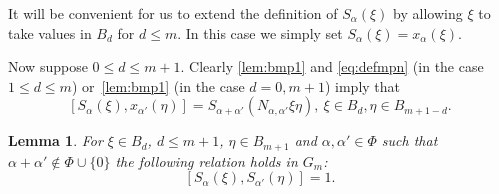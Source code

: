 \documentclass[oneside, 10pt]{amsart}
\numberwithin{equation}{section}
\newtheorem{lemma}{Lemma}
\numberwithin{lemma}{section}
\theoremstyle{definition}
\theoremstyle{remark}
\begin{document}
It will be convenient for us to extend the definition of $S_\alpha(\xi)$ by allowing $\xi$ to take values in $B_d$ for $d\leq m$.
In this case we simply set $S_\alpha(\xi) = x_\alpha(\xi)$.

Now suppose  $0 \leq d \leq m+1$. Clearly \eqref{lem:bmp1} and \eqref{eq:defmpn} (in the case $1\leq d\leq m$) or~\cref{lem:bmp1} (in the case $d=0,m+1$) imply that
\begin{equation} \label{eq:verify-bmp1'} 
[S_\alpha(\xi), x_{\alpha'}(\eta)] = S_{\alpha+\alpha'}(N_{\alpha,\alpha'}\xi \eta),\ \xi \in B_d, \eta \in B_{m+1-d}.
\end{equation}

\begin{lemma}
 For $\xi \in B_d$, $d\leq m+1$, $\eta \in B_{m+1}$ and $\alpha, \alpha' \in \Phi$ such that $\alpha + \alpha'\not\in\Phi\cup\{0\}$
 the following relation holds in $G_m$:
  \begin{equation} \label{eq:verify-bmp2} [S_\alpha(\xi), S_{\alpha'}(\eta)] = 1. \end{equation}
\end{lemma}
\end{document}
